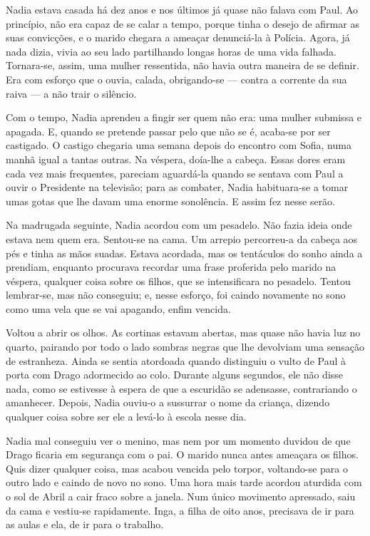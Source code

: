 Nadia estava casada há dez anos e nos últimos já quase não falava com
Paul. Ao princípio, não era capaz de se calar a tempo, porque tinha o
desejo de afirmar as suas convicções, e o marido chegara a ameaçar
denunciá-la à Polícia. Agora, já nada dizia, vivia ao seu lado partilhando longas horas de uma vida falhada. Tornara-se, assim, uma mulher
ressentida, não havia outra maneira de se definir. Era com esforço que o
ouvia, calada, obrigando-se --- contra a corrente da sua raiva --- a não
trair o silêncio.

Com o tempo, Nadia aprendeu a fingir ser quem não era: uma mulher
submissa e apagada. E, quando se pretende passar pelo que não se é,
acaba-se por ser castigado. O castigo chegaria uma semana depois do
encontro com Sofia, numa manhã igual a tantas outras. Na véspera,
doía-lhe a cabeça. Essas dores eram cada vez mais frequentes, pareciam
aguardá-la quando se sentava com Paul a ouvir o Presidente na televisão;
para as combater, Nadia habituara-se a tomar umas gotas que lhe davam
uma enorme sonolência. E assim fez nesse serão.

Na madrugada seguinte, Nadia acordou com um pesadelo. Não fazia ideia
onde estava nem quem era. Sentou-se na cama. Um arrepio percorreu-a da
cabeça aos pés e tinha as mãos suadas. Estava acordada, mas os
tentáculos do sonho ainda a prendiam, enquanto procurava recordar uma
frase proferida pelo marido na véspera, qualquer coisa sobre os filhos,
que se intensificara no pesadelo. Tentou lembrar-se, mas não conseguiu;
e, nesse esforço, foi caindo novamente no sono como uma vela que se vai
apagando, enfim vencida.

Voltou a abrir os olhos. As cortinas estavam abertas, mas quase não
havia luz no quarto, pairando por todo o lado sombras negras que lhe
devolviam uma sensação de estranheza. Ainda se sentia atordoada quando
distinguiu o vulto de Paul à porta com Drago adormecido ao colo. Durante
alguns segundos, ele não disse nada, como se estivesse à espera de que a
escuridão se adensasse, contrariando o amanhecer. Depois, Nadia
ouviu-o a sussurrar o nome da criança, dizendo qualquer coisa sobre ser
ele a levá-lo à escola nesse dia.

Nadia mal conseguiu ver o menino, mas nem por um momento duvidou de que
Drago ficaria em segurança com o pai. O marido nunca antes ameaçara os
filhos. Quis dizer qualquer coisa, mas acabou vencida pelo torpor,
voltando-se para o outro lado e caindo de novo no sono. Uma hora mais
tarde acordou aturdida com o sol de Abril a cair fraco sobre a janela.
Num único movimento apressado, saiu da cama e vestiu-se rapidamente.
Inga, a filha de oito anos, precisava de ir para as aulas e ela, de ir
para o trabalho.

